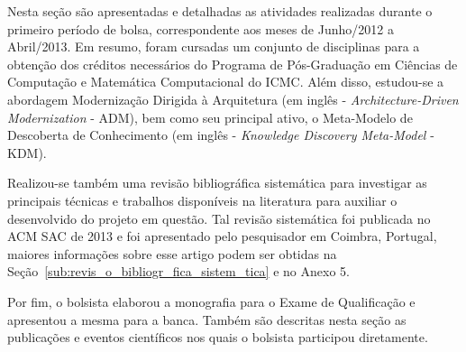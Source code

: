 Nesta seção são apresentadas e detalhadas as atividades realizadas durante o primeiro período de bolsa,  
 correspondente aos meses de Junho/2012 a Abril/2013.
 Em resumo, foram cursadas um conjunto de disciplinas para a obtenção dos créditos necessários do Programa de Pós-Graduação em Ciências de Computação e Matemática Computacional do ICMC. Além disso, estudou-se a abordagem Modernização Dirigida à Arquitetura
  (em inglês - \textit{Architecture-Driven Modernization} - ADM), bem como seu principal ativo, o Meta-Modelo de Descoberta de Conhecimento (em inglês - \textit{Knowledge Discovery Meta-Model} - KDM). 

Realizou-se também uma revisão bibliográfica sistemática para investigar as principais técnicas e trabalhos disponíveis na literatura para auxiliar o desenvolvido do projeto em questão. Tal revisão sistemática foi publicada no ACM SAC de 2013 e foi apresentado pelo pesquisador em Coimbra, Portugal, maiores informações sobre esse artigo podem ser obtidas na Seção~\ref{sub:revis_o_bibliogr_fica_sistem_tica} e no Anexo 5.
 

Por fim, o bolsista elaborou a monografia para o Exame de Qualificação e apresentou a mesma para a banca. Também são descritas nesta seção as publicações e eventos científicos nos quais o bolsista participou diretamente.